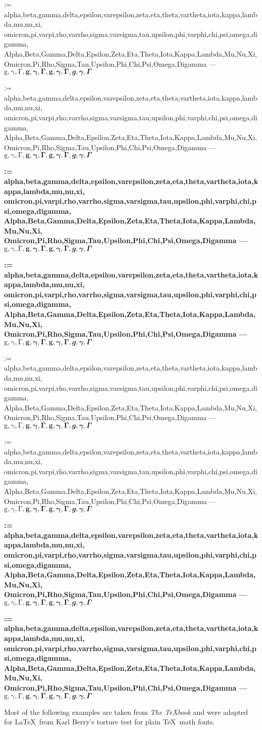 \makeatletter
\newcommand*{\checkgreekletters}{%
	\@for\@tempa:=%
	alpha,beta,gamma,delta,epsilon,varepsilon,zeta,eta,theta,vartheta,iota,kappa,lambda,mu,nu,xi,%
	omicron,pi,varpi,rho,varrho,sigma,varsigma,tau,upsilon,phi,varphi,chi,psi,omega,digamma,%
	Alpha,Beta,Gamma,Delta,Epsilon,Zeta,Eta,Theta,Iota,Kappa,Lambda,Mu,Nu,Xi,%
	Omicron,Pi,Rho,Sigma,Tau,Upsilon,Phi,Chi,Psi,Omega,Digamma%
	\do{$\csname\@tempa\endcsname,$ }%
}
\makeatother

\noindent%
{\rmfamily\selectfont\checkgreekletters --- $\mathup{g, \gamma, \Gamma}, \mathbf{g, \gamma, \Gamma}, \mathbfup{g, \gamma, \Gamma}, \mathbfit{g, \gamma, \Gamma}$}

\noindent%
{\rmfamily\selectfont{}\upgreekletters\checkgreekletters --- $\mathup{g, \gamma, \Gamma}, \mathbf{g, \gamma, \Gamma}, \mathbfup{g, \gamma, \Gamma}, \mathbfit{g, \gamma, \Gamma}$}

\noindent%
{\rmfamily\bfseries\selectfont\checkgreekletters --- $\mathup{g, \gamma, \Gamma}, \mathbf{g, \gamma, \Gamma}, \mathbfup{g, \gamma, \Gamma}, \mathbfit{g, \gamma, \Gamma}$}

\noindent%
{\rmfamily\bfseries\selectfont{}\upgreekletters\checkgreekletters --- $\mathup{g, \gamma, \Gamma}, \mathbf{g, \gamma, \Gamma}, \mathbfup{g, \gamma, \Gamma}, \mathbfit{g, \gamma, \Gamma}$}

\framebreak

\noindent%
{\sffamily\selectfont\checkgreekletters --- $\mathup{g, \gamma, \Gamma}, \mathbf{g, \gamma, \Gamma}, \mathbfup{g, \gamma, \Gamma}, \mathbfit{g, \gamma, \Gamma}$}

\noindent%
{\sffamily\selectfont{}\upgreekletters\checkgreekletters --- $\mathup{g, \gamma, \Gamma}, \mathbf{g, \gamma, \Gamma}, \mathbfup{g, \gamma, \Gamma}, \mathbfit{g, \gamma, \Gamma}$}

\noindent%
{\sffamily\bfseries\selectfont\checkgreekletters --- $\mathup{g, \gamma, \Gamma}, \mathbf{g, \gamma, \Gamma}, \mathbfup{g, \gamma, \Gamma}, \mathbfit{g, \gamma, \Gamma}$}

\noindent%
{\sffamily\bfseries\selectfont{}\upgreekletters\checkgreekletters --- $\mathup{g, \gamma, \Gamma}, \mathbf{g, \gamma, \Gamma}, \mathbfup{g, \gamma, \Gamma}, \mathbfit{g, \gamma, \Gamma}$}

\framebreak

Most of the following examples are taken from \textit{The \TeX book} \citep[][see \url{https://ctan.org/pkg/texbook}]{Knuth1984} and were adapted for \LaTeX\ from Karl Berry's torture test for plain \TeX\ math fonts.

